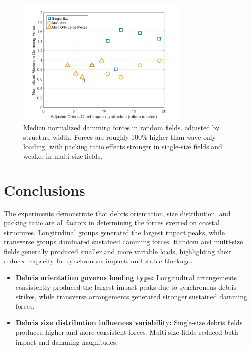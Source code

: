 \documentclass{article}
\begin{document}
{\begin{figure}[htbp]
    \centering
    \includegraphics[width=0.75\textwidth]{Damming_Median_Single_vs_Multi_Adjusted.png}
    \caption{Median normalized damming forces in random fields, adjusted by structure width. Forces are roughly 100\% higher than wave-only loading, with packing ratio effects stronger in single-size fields and weaker in multi-size fields.}
    \label{fig:random_damming_median_adjusted}
\end{figure}


\section{Conclusions} The experiments demonstrate that debris orientation, size distribution, and packing ratio are all factors in determining the forces exerted on coastal structures. Longitudinal groups generated the largest impact peaks, while transverse groups dominated sustained damming forces. Random and multi-size fields generally produced smaller and more variable loads, highlighting their reduced capacity for synchronous impacts and stable blockages. 

\begin{itemize}
    \item \textbf{Debris orientation governs loading type:} Longitudinal arrangements consistently produced the largest impact peaks due to synchronous debris strikes, while transverse arrangements generated stronger sustained damming forces.
    
    \item \textbf{Debris size distribution influences variability:} Single-size debris fields produced higher and more consistent forces. Multi-size fields reduced both impact and damming magnitudes.
    

\end{itemize}}
\end{document}
